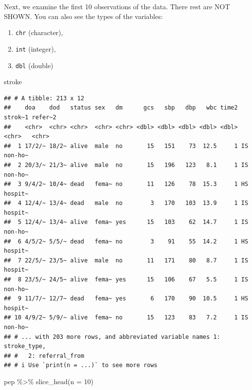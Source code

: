 \documentclass[
  10pt,
]{krantz}
\newenvironment{Shaded}{\begin{snugshade}}{\end{snugshade}}
\newcommand{\AttributeTok}[1]{\textcolor[rgb]{0.77,0.63,0.00}{#1}}
\newcommand{\DecValTok}[1]{\textcolor[rgb]{0.00,0.00,0.81}{#1}}
\newcommand{\FunctionTok}[1]{\textcolor[rgb]{0.00,0.00,0.00}{#1}}
\newcommand{\NormalTok}[1]{#1}
\newcommand{\SpecialCharTok}[1]{\textcolor[rgb]{0.00,0.00,0.00}{#1}}
\providecommand{\tightlist}{%
  \setlength{\itemsep}{0pt}\setlength{\parskip}{0pt}}
\begin{document}
Next, we examine the first 10 observations of the data. There rest are NOT SHOWN. You can also see the types of the variables:

\begin{enumerate}
\def\labelenumi{\arabic{enumi}.}
\tightlist
\item
  \texttt{chr} (character),
\item
  \texttt{int} (integer),
\item
  \texttt{dbl} (double)
\end{enumerate}

\begin{Shaded}
\begin{Highlighting}[]
\NormalTok{stroke}
\end{Highlighting}
\end{Shaded}

\begin{verbatim}
## # A tibble: 213 x 12
##    doa    dod   status sex   dm      gcs   sbp   dbp   wbc time2 strok~1 refer~2
##    <chr>  <chr> <chr>  <chr> <chr> <dbl> <dbl> <dbl> <dbl> <dbl> <chr>   <chr>  
##  1 17/2/~ 18/2~ alive  male  no       15   151    73  12.5     1 IS      non-ho~
##  2 20/3/~ 21/3~ alive  male  no       15   196   123   8.1     1 IS      non-ho~
##  3 9/4/2~ 10/4~ dead   fema~ no       11   126    78  15.3     1 HS      hospit~
##  4 12/4/~ 13/4~ dead   male  no        3   170   103  13.9     1 IS      hospit~
##  5 12/4/~ 13/4~ alive  fema~ yes      15   103    62  14.7     1 IS      non-ho~
##  6 4/5/2~ 5/5/~ dead   fema~ no        3    91    55  14.2     1 HS      hospit~
##  7 22/5/~ 23/5~ alive  male  no       11   171    80   8.7     1 IS      hospit~
##  8 23/5/~ 24/5~ alive  fema~ yes      15   106    67   5.5     1 IS      non-ho~
##  9 11/7/~ 12/7~ dead   fema~ yes       6   170    90  10.5     1 HS      hospit~
## 10 4/9/2~ 5/9/~ alive  fema~ no       15   123    83   7.2     1 IS      non-ho~
## # ... with 203 more rows, and abbreviated variable names 1: stroke_type,
## #   2: referral_from
## # i Use `print(n = ...)` to see more rows
\end{verbatim}

\begin{Shaded}
\begin{Highlighting}[]
\NormalTok{pep }\SpecialCharTok{\%\textgreater{}\%} \FunctionTok{slice\_head}\NormalTok{(}\AttributeTok{n =} \DecValTok{10}\NormalTok{)}
\end{Highlighting}
\end{Shaded}
\end{document}
